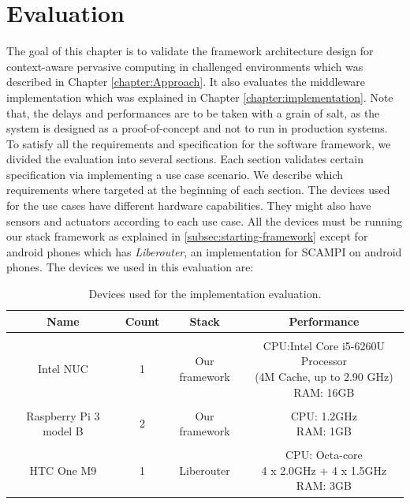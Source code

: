 
\chapter{Evaluation}\label{chapter:Evaluation}

The goal of this chapter is to validate the framework architecture design for context-aware pervasive computing in challenged environments which was described in Chapter \ref{chapter:Approach}. It also evaluates the middleware implementation which was explained in Chapter \ref{chapter:implementation}. Note that, the delays and performances are to be taken with a grain of salt, as the system is designed as a proof-of-concept and not to run in production systems. \\

\noindent To satisfy all the requirements and specification for the software framework, we divided the evaluation into several sections. Each section validates certain specification via implementing a use case scenario. We describe which requirements where targeted at the beginning of each section.
The devices used for  the use cases have different hardware capabilities. They might also have  sensors and actuators according to each use case. All the devices must be running our stack framework as explained in \ref{subsec:starting-framework} except for android phones which has \textit{Liberouter}, an implementation for SCAMPI on android phones. The devices we used in this evaluation are:
\begin{table}[!ht]
	\centering
	\begin{tabular}{*{4}{c}}\toprule
		Name & Count & Stack & Performance \\ \hline
		 &  &  &  \\
		Intel NUC &1& 	Our framework &   \specialcell[c]{CPU:Intel Core i5-6260U Processor\\ (4M Cache, up to 2.90 GHz)\\RAM: 16GB }\\ 
		&  &  &  \\
		Raspberry Pi 3 model B & 2 & Our framework &  \specialcell[c]{ CPU: 1.2GHz\\RAM: 1GB}  \\ 
		&  &  &  \\
		HTC One M9 & 1 & Liberouter &   \specialcell[c]{CPU: Octa-core \\4 x 2.0GHz + 4 x 1.5GHz\\ RAM: 3GB} \\ \hline

\end{tabular}
\caption{Devices used for the implementation evaluation.}
\label{table:devoces}
\end{table}


